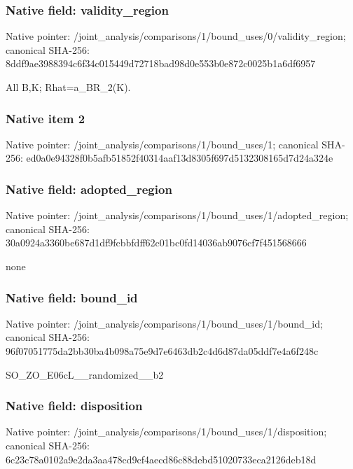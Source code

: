 \documentclass[10pt,a4paper]{article}
\begin{document}
\subsubsection{Native field: validity\_region}


Native pointer: /joint\_analysis/comparis\allowbreak{}ons/1/bound\_uses/0/valid\allowbreak{}ity\_region; canonical SHA-256: 8ddf9ae3988394c6f34c0154\allowbreak{}49d72718bad98d0e553b0e87\allowbreak{}2c0025b1a6df6957


All B,K; Rhat=a\_BR\_2(K).


\subsubsection{Native item 2}


Native pointer: /joint\_analysis/comparis\allowbreak{}ons/1/bound\_uses/1; canonical SHA-256: ed0a0e94328f0b5afb51852f\allowbreak{}40314aaf13d8305f697d5132\allowbreak{}308165d7d24a324e



\subsubsection{Native field: adopted\_region}


Native pointer: /joint\_analysis/comparis\allowbreak{}ons/1/bound\_uses/1/adopt\allowbreak{}ed\_region; canonical SHA-256: 30a0924a3360be687d1df9fc\allowbreak{}bbfdff62c01bc0fd14036ab9\allowbreak{}076cf7f451568666


none


\subsubsection{Native field: bound\_id}


Native pointer: /joint\_analysis/comparis\allowbreak{}ons/1/bound\_uses/1/bound\allowbreak{}\_id; canonical SHA-256: 96f07051775da2bb30ba4b09\allowbreak{}8a75e9d7e6463db2c4d6d87d\allowbreak{}a05ddf7e4a6f248c


SO\_ZO\_E06cL\_\_randomized\_\_b2


\subsubsection{Native field: disposition}


Native pointer: /joint\_analysis/comparis\allowbreak{}ons/1/bound\_uses/1/dispo\allowbreak{}sition; canonical SHA-256: 6c23c78a0102a9e2da3aa478\allowbreak{}cd9cf4aecd86c88debd51020\allowbreak{}733eca2126deb18d
\end{document}
